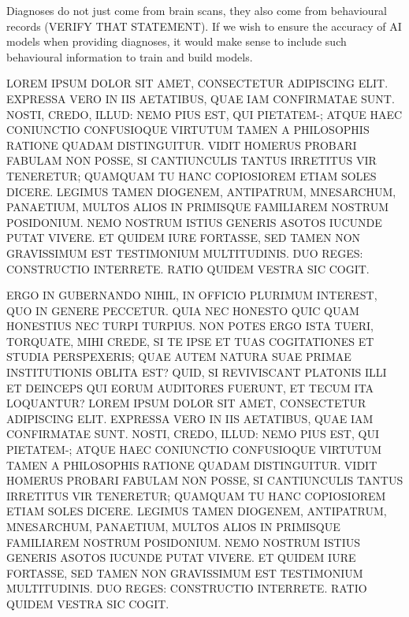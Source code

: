 \documentclass[letterpaper]{article}
\begin{document}
Diagnoses do not just come from brain scans, they also come from behavioural records (VERIFY THAT STATEMENT).
If we wish to ensure the accuracy of AI models when providing diagnoses, it would make sense to include such behavioural information to train and build models.





LOREM IPSUM DOLOR SIT AMET, CONSECTETUR ADIPISCING ELIT. EXPRESSA VERO IN IIS AETATIBUS, QUAE IAM CONFIRMATAE SUNT. NOSTI, CREDO, ILLUD: NEMO PIUS EST, QUI PIETATEM-; ATQUE HAEC CONIUNCTIO CONFUSIOQUE VIRTUTUM TAMEN A PHILOSOPHIS RATIONE QUADAM DISTINGUITUR. VIDIT HOMERUS PROBARI FABULAM NON POSSE, SI CANTIUNCULIS TANTUS IRRETITUS VIR TENERETUR; QUAMQUAM TU HANC COPIOSIOREM ETIAM SOLES DICERE. LEGIMUS TAMEN DIOGENEM, ANTIPATRUM, MNESARCHUM, PANAETIUM, MULTOS ALIOS IN PRIMISQUE FAMILIAREM NOSTRUM POSIDONIUM. NEMO NOSTRUM ISTIUS GENERIS ASOTOS IUCUNDE PUTAT VIVERE. ET QUIDEM IURE FORTASSE, SED TAMEN NON GRAVISSIMUM EST TESTIMONIUM MULTITUDINIS. DUO REGES: CONSTRUCTIO INTERRETE. RATIO QUIDEM VESTRA SIC COGIT.

ERGO IN GUBERNANDO NIHIL, IN OFFICIO PLURIMUM INTEREST, QUO IN GENERE PECCETUR. QUIA NEC HONESTO QUIC QUAM HONESTIUS NEC TURPI TURPIUS. NON POTES ERGO ISTA TUERI, TORQUATE, MIHI CREDE, SI TE IPSE ET TUAS COGITATIONES ET STUDIA PERSPEXERIS; QUAE AUTEM NATURA SUAE PRIMAE INSTITUTIONIS OBLITA EST? QUID, SI REVIVISCANT PLATONIS ILLI ET DEINCEPS QUI EORUM AUDITORES FUERUNT, ET TECUM ITA LOQUANTUR?
LOREM IPSUM DOLOR SIT AMET, CONSECTETUR ADIPISCING ELIT. EXPRESSA VERO IN IIS AETATIBUS, QUAE IAM CONFIRMATAE SUNT. NOSTI, CREDO, ILLUD: NEMO PIUS EST, QUI PIETATEM-; ATQUE HAEC CONIUNCTIO CONFUSIOQUE VIRTUTUM TAMEN A PHILOSOPHIS RATIONE QUADAM DISTINGUITUR. VIDIT HOMERUS PROBARI FABULAM NON POSSE, SI CANTIUNCULIS TANTUS IRRETITUS VIR TENERETUR; QUAMQUAM TU HANC COPIOSIOREM ETIAM SOLES DICERE. LEGIMUS TAMEN DIOGENEM, ANTIPATRUM, MNESARCHUM, PANAETIUM, MULTOS ALIOS IN PRIMISQUE FAMILIAREM NOSTRUM POSIDONIUM. NEMO NOSTRUM ISTIUS GENERIS ASOTOS IUCUNDE PUTAT VIVERE. ET QUIDEM IURE FORTASSE, SED TAMEN NON GRAVISSIMUM EST TESTIMONIUM MULTITUDINIS. DUO REGES: CONSTRUCTIO INTERRETE. RATIO QUIDEM VESTRA SIC COGIT.
\end{document}
